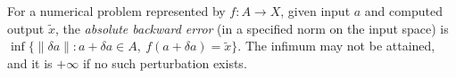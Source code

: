 
For a numerical problem represented by $f:A\to X$, given input $a$ and computed output $\widetilde x$, the \emph{absolute backward error} (in a specified norm on the input space) is $\inf\{\|\delta a\|:a+\delta a\in A,\ f(a+\delta a)=\widetilde x\}$. The infimum may not be attained, and it is $+\infty$ if no such perturbation exists.
